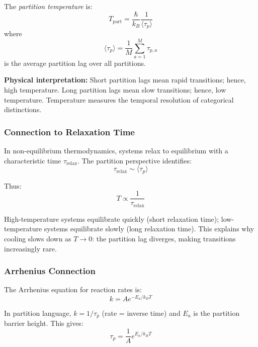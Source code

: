 \begin{definition}
The \textit{partition temperature} is:
\begin{equation}
\boxed{T_{\text{part}} = \frac{\hbar}{k_B} \frac{1}{\langle\tau_p\rangle}}
\label{eq:partition_temperature}
\end{equation}
where
\begin{equation}
\langle\tau_p\rangle = \frac{1}{M} \sum_{a=1}^{M} \tau_{p,a}
\end{equation}
is the average partition lag over all partitions.
\end{definition}

\textbf{Physical interpretation:} Short partition lags mean rapid transitions; hence, high temperature. Long partition lags mean slow transitions; hence, low temperature. Temperature measures the temporal resolution of categorical distinctions.

\subsubsection{Connection to Relaxation Time}

In non-equilibrium thermodynamics, systems relax to equilibrium with a characteristic time $\tau_{\text{relax}}$. The partition perspective identifies:
\begin{equation}
\tau_{\text{relax}} \sim \langle\tau_p\rangle
\end{equation}

Thus:
\begin{equation}
T \propto \frac{1}{\tau_{\text{relax}}}
\end{equation}

High-temperature systems equilibrate quickly (short relaxation time); low-temperature systems equilibrate slowly (long relaxation time). This explains why cooling slows down as $T \to 0$: the partition lag diverges, making transitions increasingly rare.

\subsubsection{Arrhenius Connection}

The Arrhenius equation for reaction rates is:
\begin{equation}
k = A e^{-E_a/k_B T}
\end{equation}

In partition language, $k = 1/\tau_p$ (rate = inverse time) and $E_a$ is the partition barrier height. This gives:
\begin{equation}
\tau_p = \frac{1}{A} e^{E_a/k_B T}
\end{equation}

